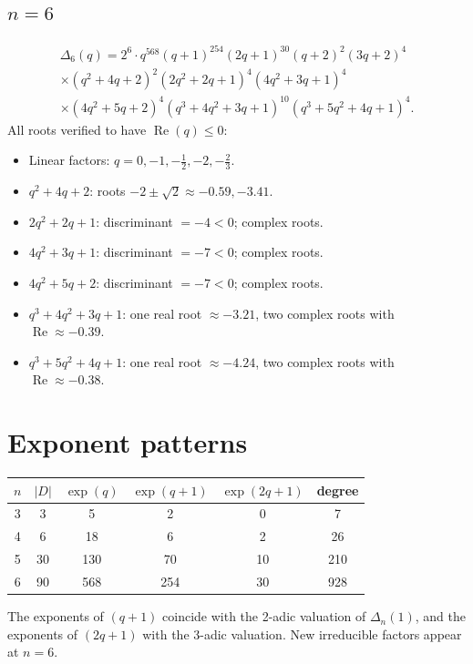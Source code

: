 \documentclass[11pt]{article}
\theoremstyle{definition}
\theoremstyle{remark}
\begin{document}
\subsection{$n = 6$}
\begin{align*}
  \Delta_6(q) = 2^6 \cdot q^{568}(q+1)^{254}(2q+1)^{30}(q+2)^2(3q+2)^4 \\
  \times (q^2 + 4q + 2)^2 (2q^2 + 2q + 1)^4 (4q^2 + 3q + 1)^4 \\
  \times (4q^2 + 5q + 2)^4 (q^3 + 4q^2 + 3q + 1)^{10} (q^3 + 5q^2 + 4q + 1)^4.
\end{align*}
All roots verified to have $\operatorname{Re}(q) \leq 0$:
\begin{itemize}
\item Linear factors: $q = 0, -1, -\frac{1}{2}, -2, -\frac{2}{3}$.
\item $q^2 + 4q + 2$: roots $-2 \pm \sqrt{2} \approx -0.59, -3.41$.
\item $2q^2 + 2q + 1$: discriminant $= -4 < 0$; complex roots.
\item $4q^2 + 3q + 1$: discriminant $= -7 < 0$; complex roots.
\item $4q^2 + 5q + 2$: discriminant $= -7 < 0$; complex roots.
\item $q^3 + 4q^2 + 3q + 1$: one real root $\approx -3.21$,
  two complex roots with $\operatorname{Re} \approx -0.39$.
\item $q^3 + 5q^2 + 4q + 1$: one real root $\approx -4.24$,
  two complex roots with $\operatorname{Re} \approx -0.38$.
\end{itemize}

\section{Exponent patterns}

\begin{center}
\begin{tabular}{cccccc}
\toprule
$n$ & $|D|$ & $\exp(q)$ & $\exp(q{+}1)$ & $\exp(2q{+}1)$ & degree \\
\midrule
3 & 3 & 5 & 2 & 0 & 7 \\
4 & 6 & 18 & 6 & 2 & 26 \\
5 & 30 & 130 & 70 & 10 & 210 \\
6 & 90 & 568 & 254 & 30 & 928 \\
\bottomrule
\end{tabular}
\end{center}

\noindent
The exponents of $(q+1)$ coincide with the 2-adic valuation of
$\Delta_n(1)$, and the exponents of $(2q+1)$ with the 3-adic
valuation.  New irreducible factors appear at $n = 6$.
\end{document}
